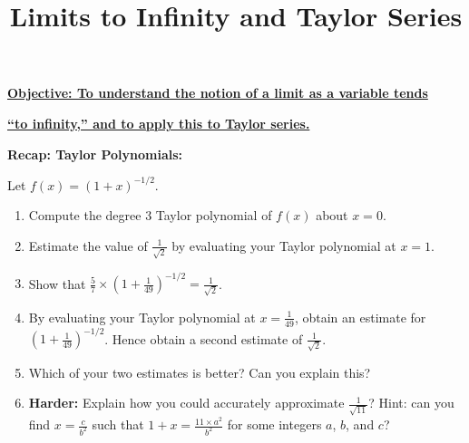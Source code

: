 \documentclass{article}
\begin{document}
\title{Limits to Infinity and Taylor Series}
\date{}

\maketitle
\thispagestyle{empty}

\Large

\textbf{\underline{Objective: To understand the notion of a limit as a variable tends}}

\textbf{\underline{``to infinity,'' and to apply this to Taylor series.}}




\vspace{5mm}


\textbf{Recap: Taylor Polynomials:}

\vspace{5mm}


Let $f(x)=(1+x)^{-1/2}$.

\begin{enumerate}
	\item Compute the degree 3 Taylor polynomial of $f(x)$ about $x=0$. %
	\item Estimate the value of $\frac{1}{\sqrt{2}}$ by evaluating your Taylor polynomial at $x=1$.
	\item Show that $\frac{5}{7}\times\left(1+\frac{1}{49}\right)^{-1/2}=\frac{1}{\sqrt{2}}$.
	\item By evaluating your Taylor polynomial at $x=\frac{1}{49}$, obtain an estimate for $\left(1+\frac{1}{49}\right)^{-1/2}$. Hence obtain a second estimate of $\frac{1}{\sqrt{2}}$.
	\item Which of your two estimates is better? Can you explain this?
	\item \textbf{Harder:} Explain how you could accurately approximate $\frac{1}{\sqrt{11}}$? Hint: can you find $x=\frac{c}{b^2}$ such that $1+x=\frac{11\times a^2}{b^2}$ for some integers $a$, $b$, and $c$? %
\end{enumerate}

\bigskip
\end{document}
